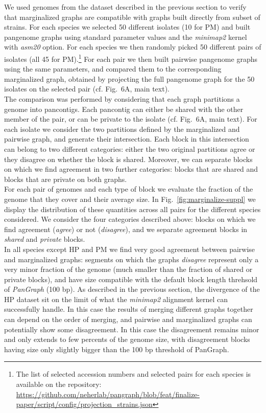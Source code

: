 \documentclass[aps,rmp,reprint,superscriptaddress,notitlepage,10pt,onecolumn]{revtex4-1}
\begin{document}
We used genomes from the dataset described in the previous section to verify that marginalized graphs are compatible with graphs built directly from subset of strains. For each species we selected 50 different isolates (10 for PM) and built pangenome graphs using standard parameter values and the \textit{minimap2} kernel with \textit{asm20} option. For each species we then randomly picked 50 different pairs of isolates (all 45 for PM).\footnote{The list of selected accession numbers and selected pairs for each species is available on the repository: \url{https://github.com/neherlab/pangraph/blob/feat/finalize-paper/script/config/projection_strains.json}} For each pair we then built pairwise pangenome graphs using the same parameters, and compared them to the corresponding marginalized graph, obtained by projecting the full pangenome graph for the 50 isolates on the selected pair (cf. Fig.~6A, main text).\\
The comparison was performed by considering that each graph partitions a genome into pancontigs. Each pancontig can either be shared with the other member of the pair, or can be private to the isolate (cf. Fig.~6A, main text). For each isolate we consider the two partitions defined by the marginalized and pairwise graph, and generate their intersection. Each block in this intersection can belong to two different categories: either the two original partitions agree or they disagree on whether the block is shared. Moreover, we can separate blocks on which we find agreement in two further categories: blocks that are shared and blocks that are private on both graphs.\\
For each pair of genomes and each type of block we evaluate the fraction of the genome that they cover and their average size. In Fig.~\ref{fig:marginalize-suppl} we display the distribution of these quantities across all pairs for the different species considered. We consider the four categories described above: blocks on which we find agreement (\textit{agree}) or not (\textit{disagree}), and we separate agreement blocks in \textit{shared} and \textit{private} blocks.\\
In all species except HP and PM we find very good agreement between pairwise and marginalized graphs: segments on which the graphs \textit{disagree} represent only a very minor fraction of the genome (much smaller than the fraction of shared or private blocks), and have size compatible with the default block length threhsold of \textit{PanGraph} (100 bp).
As described in the previous section, the divergence of the HP dataset sit on the limit of what the \textit{minimap2} alignment kernel can successfully handle. In this case the results of merging different graphs together can depend on the order of merging, and pairwise and marginalized graphs can potentially show some disagreement. In this case the disagreement remains minor and only extends to few percents of the genome size, with disagreement blocks having size only slightly bigger than the 100 bp threshold of PanGraph.
\end{document}
